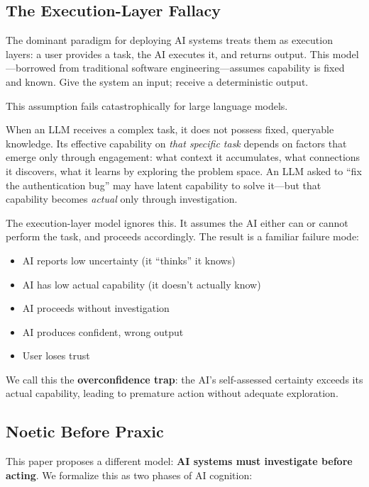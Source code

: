
\subsection{The Execution-Layer Fallacy}

The dominant paradigm for deploying AI systems treats them as execution layers: a user provides a task, the AI executes it, and returns output. This model---borrowed from traditional software engineering---assumes capability is fixed and known. Give the system an input; receive a deterministic output.

This assumption fails catastrophically for large language models.

When an LLM receives a complex task, it does not possess fixed, queryable knowledge. Its effective capability on \emph{that specific task} depends on factors that emerge only through engagement: what context it accumulates, what connections it discovers, what it learns by exploring the problem space. An LLM asked to ``fix the authentication bug'' may have latent capability to solve it---but that capability becomes \emph{actual} only through investigation.

The execution-layer model ignores this. It assumes the AI either can or cannot perform the task, and proceeds accordingly. The result is a familiar failure mode:

\begin{itemize}
    \item AI reports low uncertainty (it ``thinks'' it knows)
    \item AI has low actual capability (it doesn't actually know)
    \item AI proceeds without investigation
    \item AI produces confident, wrong output
    \item User loses trust
\end{itemize}

We call this the \textbf{overconfidence trap}: the AI's self-assessed certainty exceeds its actual capability, leading to premature action without adequate exploration.

\subsection{Noetic Before Praxic}

This paper proposes a different model: \textbf{AI systems must investigate before acting}. We formalize this as two phases of AI cognition:

